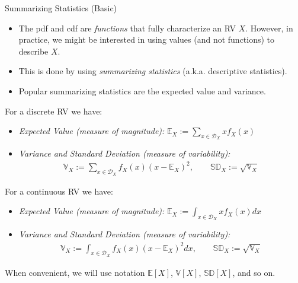 \documentclass[9pt]{beamer}
\begin{document}
%
\begin{frame}{Summarizing Statistics (Basic)}

\begin{itemize}
\item The pdf and cdf are {\em functions} that fully characterize an RV $X$. However, in practice, we might be interested in using values (and not functions) to describe $X$.  
\item This is done by using {\em summarizing statistics} (a.k.a. descriptive statistics).  
\item Popular summarizing statistics are the expected value and variance. 
\end{itemize}
\begin{block}{}
For a discrete RV we have:
\begin{itemize}
\item {\em Expected Value (measure of magnitude):} $\mathbb{E}_X:=\sum_{x\in {\mathcal{D}}_X}x{f}_X(x)$

\item {\em Variance and Standard Deviation (measure of variability):} 
\begin{align*}
\mathbb{V}_X:=\sum_{x\in {\mathcal{D}}_X}f_X(x)(x-\mathbb{E}_X)^2,\qquad \mathbb{SD}_X:=\sqrt{\mathbb{V}_X}
\end{align*}
\end{itemize}
\end{block}

\begin{block}{}
For a continuous RV we have:
\begin{itemize}
\item {\em Expected Value (measure of magnitude):}  $\mathbb{E}_X:=\int_{x\in {\mathcal{D}}_X}x{f}_X(x)dx$
\item {\em Variance and Standard Deviation (measure of variability):} 
\begin{align*}
\mathbb{V}_X:=\int_{x\in {\mathcal{D}}_X}f_X(x)(x-\mathbb{E}_X)^2dx,\qquad \mathbb{SD}_X:=\sqrt{\mathbb{V}_X}
\end{align*}
\end{itemize}
\end{block}
When convenient, we will use notation $\mathbb{E}[X]$, $\mathbb{V}[X]$, $\mathbb{SD}[X]$, and so on. 
\end{frame}
\end{document}

